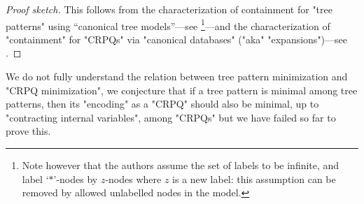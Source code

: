\begin{proof}[Proof sketch]
	This follows from the characterization of containment for "tree patterns"
	using ``canonical tree models''---see \cite[\S4.2]{CzerwinskiMartensNiewerthParys2018Minimization}\footnote{Note
	however that the authors assume the set of labels to be infinite, and label `$*$'-nodes
	by $z$-nodes where $z$ is a new label: this assumption can be removed by
	allowed unlabelled nodes in the model.}---and the characterization of "containment" for "CRPQs"
	via "canonical databases" ("aka" "expansions")---see .
\end{proof}

We do not fully understand the relation between tree pattern minimization and "CRPQ minimization", 
we conjecture that if a tree pattern is minimal among tree patterns, then its "encoding" as a 
"CRPQ" should also be minimal, up to "contracting internal variables", among "CRPQs" but we have failed so far to prove this. 